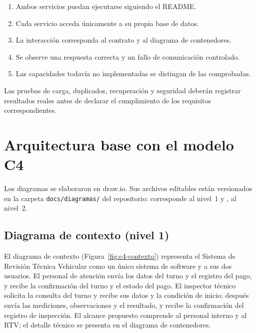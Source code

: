 \documentclass[11pt,a4paper]{article}
\begin{document}
	\begin{enumerate}[nosep]
		\item Ambos servicios puedan ejecutarse siguiendo el README.
		\item Cada servicio acceda únicamente a su propia base de datos.
		\item La interacción corresponda al contrato y al diagrama de contenedores.
		\item Se observe una respuesta correcta y un fallo de comunicación controlado.
		\item Las capacidades todavía no implementadas se distingan de las comprobadas.
	\end{enumerate}
	
	Las pruebas de carga, duplicados, recuperación y seguridad deberán registrar resultados reales antes de declarar el cumplimiento de los requisitos correspondientes.
	
	\section{Arquitectura base con el modelo C4}
	Los diagramas se elaboraron en draw.io. Sus archivos editables están versionados en la carpeta \texttt{docs/diagramas/} del repositorio:  corresponde al nivel~1 y , al nivel~2.
	
	\subsection{Diagrama de contexto (nivel 1)}
	El diagrama de contexto (Figura~\ref{fig:c4-contexto}) representa el Sistema de Revisión Técnica Vehicular como un único sistema de software y a sus dos usuarios. El personal de atención envía los datos del turno y el registro del pago, y recibe la confirmación del turno y el estado del pago. El inspector técnico solicita la consulta del turno y recibe sus datos y la condición de inicio; después envía las mediciones, observaciones y el resultado, y recibe la confirmación del registro de inspección. El alcance propuesto comprende al personal interno y al RTV; el detalle técnico se presenta en el diagrama de contenedores.
	
\end{document}
